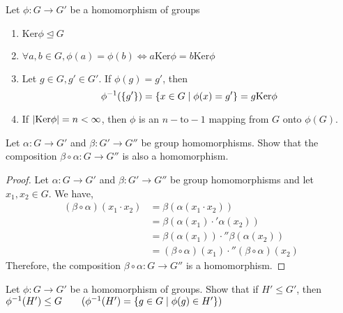 \begin{remark}
    Let $\phi : G \to G'$ be a homomorphism of groups
    \begin{enumerate}
        \item $\text{Ker} \phi \unlhd G$
        \item $\forall a, b \in G, \phi (a) = \phi  (b) \Leftrightarrow a\text{Ker} \phi = b \text{Ker} \phi$
        \item Let $g \in G, g' \in G'$. If $\phi (g) = g'$, then 
        \[ \phi^{-1} \qty(\qty{g'}) = \qty{x \in G \mid \phi (x) = g'} = g\text{Ker}\phi \]
        \item If $\qty|\text{Ker} \phi| = n < \infty$, then $\phi$ is an $n-\text{to}-1$ mapping from $G$ onto $\phi(G)$.
    \end{enumerate}
\end{remark}

\begin{exercise}
    Let $\alpha : G \to G'$ and $\beta : G' \to G''$ be group homomorphisms. Show that the composition $\beta \circ \alpha : G \to G''$ is also a homomorphism.
\end{exercise}

\begin{proof}
    Let $\alpha : G \to G'$ and $\beta : G' \to G''$ be group homomorphisms and let $x_1, x_2 \in G$. We have,
    \begin{align*}
        (\beta \circ \alpha) (x_1 \cdot x_2) &= \beta(\alpha(x_1 \cdot x_2)) \\
        &= \beta(\alpha (x_1) \cdot' \alpha(x_2)) \\
        &= \beta(\alpha(x_1)) \cdot'' \beta(\alpha(x_2)) \\
        &= (\beta \circ \alpha)(x_1) \cdot'' (\beta \circ \alpha)(x_2)
    \end{align*}
    Therefore, the composition $\beta \circ \alpha : G \to G''$ is a homomorphism. \qedsymbol
\end{proof}

\begin{exercise}
    Let $\phi : G \to G'$ be a homomorphism of groups. Show that if $H' \leq G'$, then $\phi^{-1} \qty(H') \leq G \hspace{2em} (\phi^{-1} (H') = \qty{g \in G \mid \phi(g) \in H'})$ 
\end{exercise}

